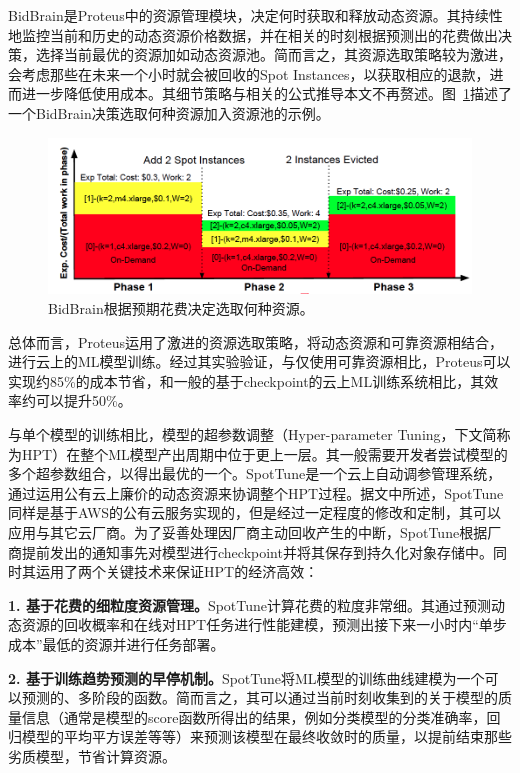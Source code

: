 BidBrain是Proteus中的资源管理模块，决定何时获取和释放动态资源。其持续性地监控当前和历史的动态资源价格数据，并在相关的时刻根据预测出的花费做出决策，选择当前最优的资源加如动态资源池。简而言之，其资源选取策略较为激进，会考虑那些在未来一个小时就会被回收的Spot Instances，以获取相应的退款，进而进一步降低使用成本。其细节策略与相关的公式推导本文不再赘述。图~\ref{bidbrain_phase}描述了一个BidBrain决策选取何种资源加入资源池的示例。

\begin{figure}[h]
    \centerline{\includegraphics[width=\textwidth]{figures/bidbrain-phase.png}}
    \caption{BidBrain根据预期花费决定选取何种资源。}
    \label{bidbrain_phase}
\end{figure}

总体而言，Proteus运用了激进的资源选取策略，将动态资源和可靠资源相结合，进行云上的ML模型训练。经过其实验验证，与仅使用可靠资源相比，Proteus可以实现约85\%的成本节省，和一般的基于checkpoint的云上ML训练系统相比，其效率约可以提升50\%。

与单个模型的训练相比，模型的超参数调整（Hyper-parameter Tuning，下文简称为HPT）在整个ML模型产出周期中位于更上一层。其一般需要开发者尝试模型的多个超参数组合，以得出最优的一个。SpotTune是一个云上自动调参管理系统，通过运用公有云上廉价的动态资源来协调整个HPT过程。据文中所述，SpotTune同样是基于AWS的公有云服务实现的，但是经过一定程度的修改和定制，其可以应用与其它云厂商。为了妥善处理因厂商主动回收产生的中断，SpotTune根据厂商提前发出的通知事先对模型进行checkpoint并将其保存到持久化对象存储中。同时其运用了两个关键技术来保证HPT的经济高效：

\textbf{1. 基于花费的细粒度资源管理。}SpotTune计算花费的粒度非常细。其通过预测动态资源的回收概率和在线对HPT任务进行性能建模，预测出接下来一小时内“单步成本”最低的资源并进行任务部署。

\textbf{2. 基于训练趋势预测的早停机制。}SpotTune将ML模型的训练曲线建模为一个可以预测的、多阶段的函数。简而言之，其可以通过当前时刻收集到的关于模型的质量信息（通常是模型的score函数所得出的结果，例如分类模型的分类准确率，回归模型的平均平方误差等等）来预测该模型在最终收敛时的质量，以提前结束那些劣质模型，节省计算资源。

